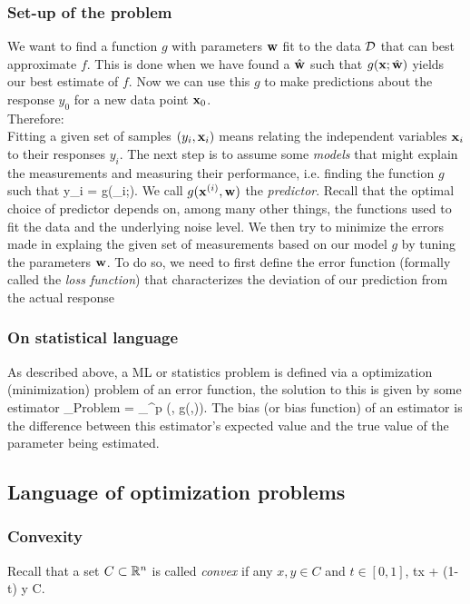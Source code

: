\subsubsection{Set-up of the problem}
We want to find a function $g$ with parameters $\mathbf{w}$ fit to the data $\mathcal{D}$ that can best approximate $f$. This is done when we have found a $\hat{\mathbf{w}}$ such that $g(\mathbf{x};\hat{\mathbf{w}})$ yields our best estimate of $f$. Now we can use this $g$ to make predictions about the response $y_0$ for a new data point $\mathbf{x}_0$.\\
Therefore:\\
Fitting a given set of samples $(y_i,\mathbf{x}_i)$ means relating the independent variables $\mathbf{x}_i$ to their responses $y_i$. The next step is to assume some \emph{models} that might explain the measurements and measuring their performance, i.e. finding the function $g$ such that
\bse 
y_i = g(\mx_i;\mw).
\ese 
We call $g(\mathbf{x}^{(i)},\mathbf{w})$ the \emph{predictor}. Recall that the optimal choice of predictor depends on, among many other things, the functions used to fit the data and the underlying noise level.
We then try to minimize the errors made in explaing the given set of measurements based on our model $g$ by tuning the parameters $\mathbf{w}$. To do so, we need to first define the error function (formally called the  \emph{loss function}) that characterizes the deviation of our prediction from the actual response




\subsubsection{On statistical language}
As described above, a ML or statistics problem is defined via a optimization (minimization) problem of an error function, the solution to this is given by some estimator
\be 
\hat{\mw}_{Problem} = \arg \min_{\mw \in \mR^p} \mC(\mX, g(\mw,\my)).
\ee 
The bias (or bias function) of an estimator is the difference between this estimator's expected value and the true value of the parameter being estimated.


\subsection{Language of optimization problems}
\subsubsection{Convexity}
Recall that a set $C\subset\mathbb{R}^n$ is called \emph{convex} if any  $x,y\in C$  and  $t\in [0,1]$,
\bse 
tx + (1-t) y \in C.
\ese 

